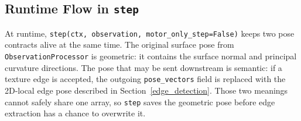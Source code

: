 \documentclass{article}
\begin{document}
\subsection{Runtime Flow in \texttt{step}}

At runtime, \texttt{step(ctx, observation, motor\_only\_step=False)} keeps two pose contracts alive at the same time.
The original surface pose from \texttt{ObservationProcessor} is geometric: it contains the surface normal and principal curvature directions.
The pose that may be sent downstream is semantic: if a texture edge is accepted, the outgoing \texttt{pose\_vectors} field is replaced with the 2D-local edge pose described in Section~\ref{edge_detection}.
Those two meanings cannot safely share one array, so \texttt{step} saves the geometric pose before edge extraction has a chance to overwrite it.
\end{document}
